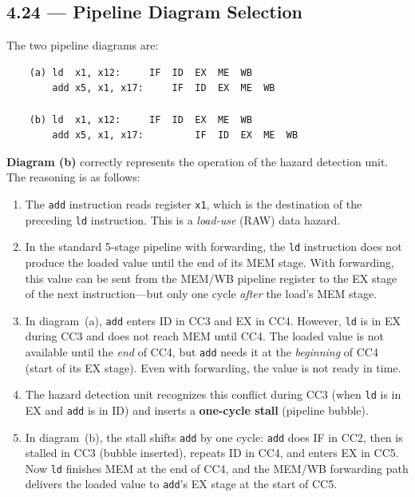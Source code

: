 \subsection*{4.24 --- Pipeline Diagram Selection}
\hypertarget{sol-4.24}{}

The two pipeline diagrams are:

\begin{verbatim}
    (a) ld  x1, x12:     IF  ID  EX  ME  WB
        add x5, x1, x17:     IF  ID  EX  ME  WB

    (b) ld  x1, x12:     IF  ID  EX  ME  WB
        add x5, x1, x17:         IF  ID  EX  ME  WB
\end{verbatim}

\textbf{Diagram (b)} correctly represents the operation of the hazard
detection unit.  The reasoning is as follows:

\begin{enumerate}
  \item The \texttt{add} instruction reads register \texttt{x1}, which is the
        destination of the preceding \texttt{ld} instruction.  This is a
        \emph{load-use} (RAW) data hazard.

  \item In the standard 5-stage pipeline with forwarding, the \texttt{ld}
        instruction does not produce the loaded value until the end of its
        MEM stage.  With forwarding, this value can be sent from the MEM/WB
        pipeline register to the EX stage of the next instruction---but only
        one cycle \emph{after} the load's MEM stage.

  \item In diagram~(a), \texttt{add} enters ID in CC3 and EX in CC4.
        However, \texttt{ld} is in EX during CC3 and does not reach MEM until
        CC4.  The loaded value is not available until the \emph{end} of CC4,
        but \texttt{add} needs it at the \emph{beginning} of CC4 (start of
        its EX stage).  Even with forwarding, the value is not ready in time.

  \item The hazard detection unit recognizes this conflict during CC3
        (when \texttt{ld} is in EX and \texttt{add} is in ID) and inserts a
        \textbf{one-cycle stall} (pipeline bubble).

  \item In diagram~(b), the stall shifts \texttt{add} by one cycle:
        \texttt{add} does IF in CC2, then is stalled in CC3 (bubble inserted),
        repeats ID in CC4, and enters EX in CC5.  Now \texttt{ld} finishes
        MEM at the end of CC4, and the MEM/WB forwarding path delivers the
        loaded value to \texttt{add}'s EX stage at the start of CC5.
        \checkmark
\end{enumerate}


